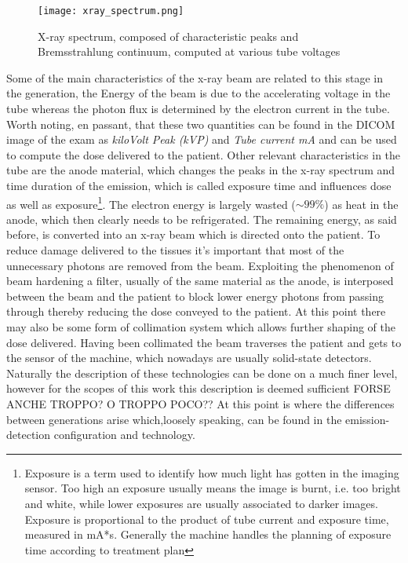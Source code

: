 \begin{figure}[H]
		\centering
  		\texttt{[image: xray\_spectrum.png]}
        \caption{X-ray spectrum, composed of characteristic peaks and Bremsstrahlung	continuum, computed at various tube voltages\label{fig:x-ray spectrum}}
\end{figure}

Some of the main characteristics of the x-ray beam are related to this stage in the generation, the Energy of the beam is due to the accelerating voltage in the tube  whereas the photon flux is determined by the electron current in the tube. Worth noting, en passant, that these two quantities can be found in the DICOM image of the exam as \textit{kiloVolt Peak (kVP)} and \textit{Tube current mA} and can be used to compute the dose delivered to the patient.
Other relevant characteristics in the tube are the anode material, which changes the peaks in the x-ray spectrum and time duration of the emission, which is called exposure time and influences dose as well as exposure\footnote{Exposure is a term used to identify how much light has gotten in the imaging sensor. Too high an exposure usually means the image is burnt, i.e. too bright and white, while lower exposures are usually associated to darker images. Exposure is proportional to the product of tube current and exposure time, measured in mA*s. Generally the machine handles the planning of exposure time according to treatment plan}.
The electron energy is largely wasted ($\sim 99\%$) as heat in the anode, which then clearly needs to be refrigerated. The remaining energy, as said before, is converted into an x-ray beam which is directed onto the patient. To reduce damage delivered to the tissues it's important that most of the unnecessary photons are removed from the beam. 
Exploiting the phenomenon of beam hardening a filter, usually of the same material as the anode, is interposed between the beam and the patient to block lower energy photons from passing through thereby reducing the dose conveyed to the patient. At this point there may also be some form of collimation system which allows further shaping of the dose delivered. Having been collimated the beam traverses the patient and gets to the sensor of the machine, which nowadays are usually solid-state detectors.
Naturally the description of these technologies can be done on a much finer level, however for the scopes of this work this description is deemed sufficient {\Large FORSE ANCHE TROPPO? O TROPPO POCO??}
At this point is where the differences between generations arise which,loosely speaking, can be found in the emission-detection configuration and technology.

